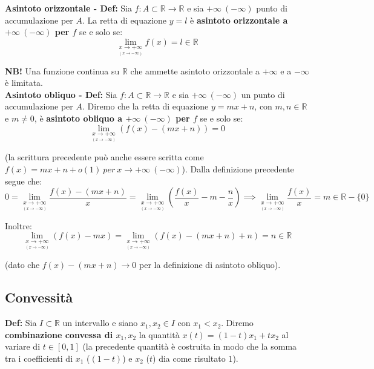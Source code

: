 \documentclass{article}
\begin{document}
\noindent\textbf{Asintoto orizzontale - Def:} Sia $f: A \subset \mathbb{R} \xrightarrow{} \mathbb{R}$ e sia $+\infty \ (-\infty)$ punto di accumulazione per $A$. La retta di equazione $y = l$ è \textbf{asintoto orizzontale a $+\infty \ (-\infty)$ per $f$} se e solo se:
\begin{equation*}
    \lim_{\underset{\scriptstyle (x \to -\infty)}{x \to +\infty}} f(x) = l \in \mathbb{R}
\end{equation*}

\noindent\textbf{NB!} Una funzione continua su $\mathbb{R}$ che ammette asintoto orizzontale a $+\infty$ e a $-\infty$ è limitata.\\

\noindent\textbf{Asintoto obliquo - Def:} Sia $f: A \subset \mathbb{R} \xrightarrow{} \mathbb{R}$ e sia $+\infty \ (-\infty)$ un punto di accumulazione per $A$. Diremo che la retta di equazione $y = mx + n$, con $m, n \in \mathbb{R}$ e $m \neq 0$, è \textbf{asintoto obliquo a $+\infty \ (-\infty)$ per $f$} se e solo se:
\begin{equation*}
    \lim_{\underset{\scriptstyle (x \to -\infty)}{x \to +\infty}} (f(x) - (mx + n)) = 0
\end{equation*}

\noindent (la scrittura precedente può anche essere scritta come $f(x) = mx + n + o(1) \ per \ x \to +\infty \ (-\infty)$). Dalla definizione precedente segue che:
\begin{equation*}
    0 = \lim_{\underset{\scriptstyle (x \to -\infty)}{x \to +\infty}} \frac{f(x) - (mx + n)}{x} = \lim_{\underset{\scriptstyle (x \to -\infty)}{x \to +\infty}} \left(\frac{f(x)}{x} - m - \frac{n}{x}\right) \implies \lim_{\underset{\scriptstyle (x \to -\infty)}{x \to +\infty}} \frac{f(x)}{x} = m \in \mathbb{R} - \{0\}
\end{equation*}

\noindent Inoltre:
\begin{equation*}
    \lim_{\underset{\scriptstyle (x \to -\infty)}{x \to +\infty}} (f(x) - mx) = \lim_{\underset{\scriptstyle (x \to -\infty)}{x \to +\infty}} (f(x) - (mx + n) + n) = n \in \mathbb{R}
\end{equation*}

\noindent (dato che $f(x) - (mx + n) \to 0$ per la definizione di asintoto obliquo).

\subsection{Convessità}
\textbf{Def:} Sia $I \subset \mathbb{R}$ un intervallo e siano $x_1, x_2 \in I$ con $x_1 < x_2$. Diremo \textbf{combinazione convessa di $x_1, x_2$} la quantità $x(t) = (1 - t)x_1 + tx_2$ al variare di $t \in [0, 1]$ (la precedente quantità è costruita in modo che la somma tra i coefficienti di $x_1$ ($(1 - t)$) e $x_2$ ($t$) dia come risultato $1$).\\
\end{document}
